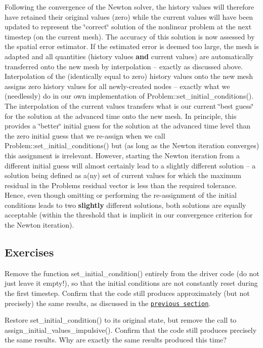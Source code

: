 Following the convergence of the Newton solver, the history values will therefore have retained their original values (zero) while the current values will have been updated to represent the \char`\"{}correct\char`\"{} solution of the nonlinear problem at the next timestep (on the current mesh). The accuracy of this solution is now assessed by the spatial error estimator. If the estimated error is deemed too large, the mesh is adapted and all quantities (history values {\bfseries and} current values) are automatically transferred onto the new mesh by interpolation -- exactly as discussed above. Interpolation of the (identically equal to zero) history values onto the new mesh assigns zero history values for all newly-\/created nodes -- exactly what we (needlessly) do in our own implementation of {\ttfamily Problem\+::set\+\_\+initial\+\_\+conditions()}. The interpolation of the current values transfers what is our current \char`\"{}best guess\char`\"{} for the solution at the advanced time onto the new mesh. In principle, this provides a \char`\"{}better\char`\"{} initial guess for the solution at the advanced time level than the zero initial guess that we re-\/assign when we call {\ttfamily Problem\+::set\+\_\+initial\+\_\+conditions()} but (as long as the Newton iteration converges) this assignment is irrelevant. However, starting the Newton iteration from a different initial guess will almost certainly lead to a slightly different solution -- a solution being defined as a(ny) set of current values for which the maximum residual in the {\ttfamily Problem\textquotesingle{}s} residual vector is less than the required tolerance. Hence, even though omitting or performing the re-\/assignment of the initial conditions leads to two {\bfseries slightly} different solutions, both solutions are equally acceptable (within the threshold that is implicit in our convergence criterion for the Newton iteration).\hypertarget{index_exercises}{}\subsection{Exercises}\label{index_exercises}

\begin{DoxyEnumerate}
\item Remove the function {\ttfamily set\+\_\+initial\+\_\+condition()} entirely from the driver code (do not just leave it empty!), so that the initial conditions are not constantly reset during the first timestep. Confirm that the code still produces approximately (but not precisely) the same results, as discussed in the \href{#good_practice_ics}{\tt previous section}.
\item Restore {\ttfamily set\+\_\+initial\+\_\+condition()} to its original state, but remove the call to {\ttfamily assign\+\_\+initial\+\_\+values\+\_\+impulsive()}. Confirm that the code still produces precisely the same results. Why are exactly the same results produced this time?
\end{DoxyEnumerate}




